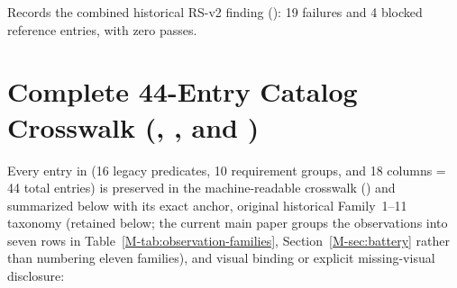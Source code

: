 Records the combined historical RS-v2 finding (): 19 failures and 4 blocked reference entries, with zero passes.

\section{Complete 44-Entry Catalog Crosswalk (, , and )}
\label{sup:crosswalk-44}

Every entry in  (16  legacy predicates, 10  requirement groups, and 18  columns = 44 total entries) is preserved in the machine-readable crosswalk () and summarized below with its exact  anchor, original historical Family~1--11 taxonomy (retained below; the current main paper groups the observations into seven rows in Table~\ref{M-tab:observation-families}, Section~\ref{M-sec:battery} rather than numbering eleven families), and visual binding or explicit missing-visual disclosure:
